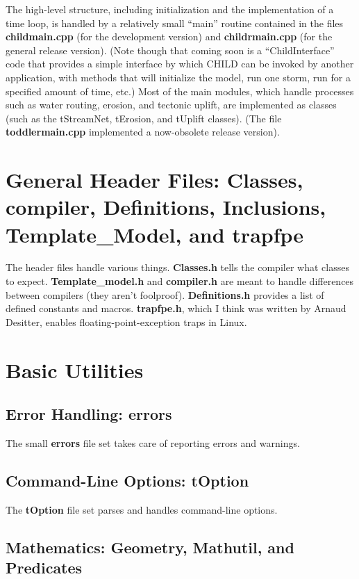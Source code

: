 \documentclass[12pt]{article}
\begin{document}
The high-level structure, including initialization and the implementation of a time loop, is handled by a relatively small ``main'' routine contained in the files {\bf childmain.cpp} (for the development version) and {\bf childrmain.cpp} (for the general release version). 
(Note though that coming soon is a ``ChildInterface'' code that provides a
simple interface by which CHILD can be invoked by another application, with
methods that will initialize the model, run one storm, run for a specified
amount of time, etc.)
Most of the main modules, which handle processes such as water routing, erosion, and tectonic uplift, are implemented as classes (such as the tStreamNet, tErosion, and tUplift classes). (The file {\bf toddlermain.cpp} implemented a now-obsolete release version).

\section{General Header Files: Classes, compiler, Definitions, Inclusions, Template\_Model, and trapfpe}

The header files handle various things. {\bf Classes.h} tells the compiler 
what classes to expect. {\bf Template\_model.h} and {\bf compiler.h} are meant 
to handle differences between compilers (they aren't foolproof). 
{\bf Definitions.h} provides a list of defined constants and macros. 
{\bf trapfpe.h}, which I think was written by Arnaud Desitter, enables 
floating-point-exception traps in Linux.

\section{Basic Utilities}

\subsection{Error Handling: errors}

The small {\bf errors} file set takes care of reporting errors and warnings.

\subsection{Command-Line Options: tOption}

The {\bf tOption} file set parses and handles command-line options.

\subsection{Mathematics: Geometry, Mathutil, and Predicates}
\end{document}
